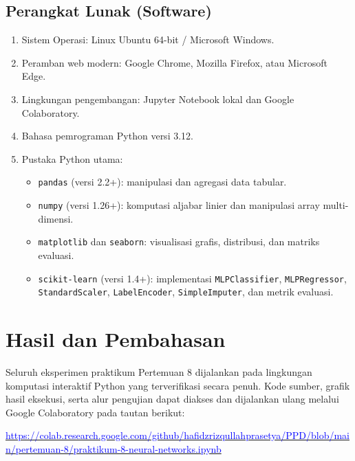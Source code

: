 \documentclass[a4paper,oneside,12pt]{report}
\newcommand{\tocboldsection}[1]{%
  \protect\renewcommand{\protect\cftchapfont}{\protect\bfseries}%
  #1%
  \protect\renewcommand{\protect\cftchapfont}{}%
}
\begin{document}
\section{Perangkat Lunak (Software)}
\begin{enumerate}[noitemsep, topsep=2pt, parsep=1pt]
	\item Sistem Operasi: Linux Ubuntu 64-bit / Microsoft Windows.
	\item Peramban web modern: Google Chrome, Mozilla Firefox, atau Microsoft Edge.
	\item Lingkungan pengembangan: Jupyter Notebook lokal dan Google Colaboratory.
	\item Bahasa pemrograman Python versi 3.12.
	\item Pustaka Python utama:
	      \begin{itemize}[noitemsep, topsep=1pt, parsep=0.5pt]
		      \item \texttt{pandas} (versi 2.2+): manipulasi dan agregasi data tabular.
		      \item \texttt{numpy} (versi 1.26+): komputasi aljabar linier dan manipulasi array multi-dimensi.
		      \item \texttt{matplotlib} dan \texttt{seaborn}: visualisasi grafis, distribusi, dan matriks evaluasi.
		      \item \texttt{scikit-learn} (versi 1.4+): implementasi \texttt{MLPClassifier}, \texttt{MLPRegressor}, \texttt{StandardScaler}, \texttt{LabelEncoder}, \texttt{SimpleImputer}, dan metrik evaluasi.
	      \end{itemize}
\end{enumerate}

\clearpage

\chapter[\texorpdfstring{\tocboldsection{Hasil dan Pembahasan}}{Hasil dan Pembahasan}]{Hasil dan Pembahasan}

Seluruh eksperimen praktikum Pertemuan 8 dijalankan pada lingkungan komputasi interaktif Python yang terverifikasi secara penuh. Kode sumber, grafik hasil eksekusi, serta alur pengujian dapat diakses dan dijalankan ulang melalui Google Colaboratory pada tautan berikut:

\begin{center}
	\href{https://colab.research.google.com/github/hafidzrizqullahprasetya/PPD/blob/main/pertemuan-8/praktikum-8-neural-networks.ipynb}{\textcolor{blue}{\url{https://colab.research.google.com/github/hafidzrizqullahprasetya/PPD/blob/main/pertemuan-8/praktikum-8-neural-networks.ipynb}}} \cite{colab-notebook}
\end{center}
\end{document}

